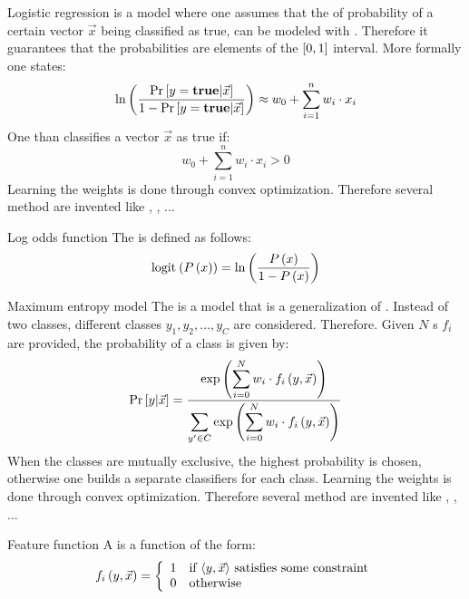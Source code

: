 \begin{df}{Logistic regression}
\sb{} is a model where one assumes that the  of probability of a certain vector $\vec{x}$ being classified as true, can be modeled with . Therefore it guarantees that the probabilities are elements of the $\left[0,1\right]$ interval. More formally one states:
\begin{equation}
\ln\left(\displaystyle\frac{\Pr\left[y=\mbox{\textbf{true}}{}|\vec{x}\right]}{1-\Pr\left[y=\mbox{\textbf{true}}{}|\vec{x}\right]}\right)\approx w_0+\displaystyle\sum_{i=1}^{n}w_i\cdot x_i
\end{equation}
One than classifies a vector $\vec{x}$ as true if:
\begin{equation}
w_0+\displaystyle\sum_{i=1}^{n}w_i\cdot x_i>0
\end{equation}
Learning the weights is done through convex optimization. Therefore several method are invented like , , ...
\end{df}
\begin{df}[Logit]{Log odds function}
The \sb{} is defined as follows:
\begin{equation}
\mbox{logit}_{}\left(P\left(x\right)\right)=\ln\left(\displaystyle\frac{P\left(x\right)}{1-P\left(x\right)}\right)
\end{equation}
\end{df}
\begin{df}{Maximum entropy model}
The \sb{} is a model that is a generalization of . Instead of two classes, different classes $y_1,y_2,\ldots,y_C$ are considered. Therefore. Given $N$ s $f_i$ are provided, the probability of a class is given by:
\begin{equation}
\Pr\left[y|\vec{x}\right]=\displaystyle\frac{\exp\left(\displaystyle\sum_{i=0}^N{w_i\cdot f_i\left(y,\vec{x}\right)}\right)}{\displaystyle\sum_{y'\in C}\exp\left(\displaystyle\sum_{i=0}^N{w_i\cdot f_i\left(y,\vec{x}\right)}\right)}
\end{equation}
When the classes are mutually exclusive, the highest probability is chosen, otherwise one builds a separate classifiers for each class. Learning the weights is done through convex optimization. Therefore several method are invented like , , ...
\end{df}
\begin{df}{Feature function}
A \sb{} is a function of the form:
\begin{equation}
f_i\left(y,\vec{x}\right)=\left\{\begin{array}{ll} 
1&\mbox{if $\left\langle y,\vec{x}\right\rangle$ satisfies some constraint}\\
0&\mbox{otherwise} \end{array}\right.
\end{equation}
\end{df}
